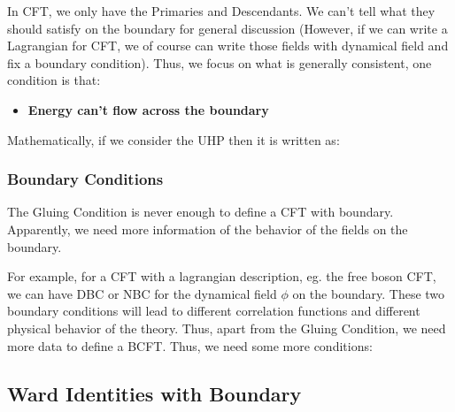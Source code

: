 In CFT, we only have the Primaries and Descendants. We can't tell what they should satisfy on the boundary for general discussion (However, if we can write a Lagrangian for CFT, we of course can write those fields with dynamical field and fix a boundary condition). Thus, we focus on what is generally consistent, one condition is that:
\begin{itemize}
  \item \textbf{Energy can't flow across the boundary}
\end{itemize}
Mathematically, if we consider the UHP then it is written as:


\subsubsection{Boundary Conditions}

The Gluing Condition is never enough to define a CFT with boundary. Apparently, we need more information of the behavior of the fields on the boundary. 

For example, for a CFT with a lagrangian description, eg. the free boson CFT, we can have DBC or NBC for the dynamical field $ \phi $ on the boundary. These two boundary conditions will lead to different correlation functions and different physical behavior of the theory. Thus, apart from the Gluing Condition, we need more data to define a BCFT. Thus, we need some more conditions:



\subsection{Ward Identities with Boundary}

